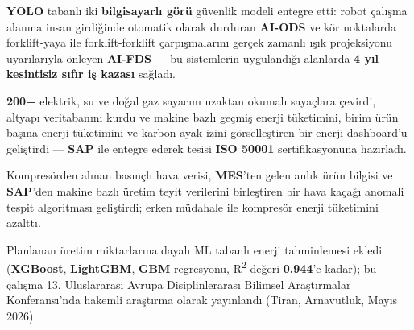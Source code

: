 \begin{cventries}
{\begin{cvitems}
        \item {\textbf{YOLO} tabanlı iki \textbf{bilgisayarlı görü} güvenlik modeli entegre etti: robot çalışma alanına insan girdiğinde otomatik olarak durduran \textbf{AI-ODS} ve kör noktalarda forklift-yaya ile forklift-forklift çarpışmalarını gerçek zamanlı ışık projeksiyonu uyarılarıyla önleyen \textbf{AI-FDS} --- bu sistemlerin uygulandığı alanlarda \textbf{4 yıl kesintisiz sıfır iş kazası} sağladı.}
        \item {\textbf{200+} elektrik, su ve doğal gaz sayacını uzaktan okumalı sayaçlara çevirdi, altyapı veritabanını kurdu ve makine bazlı geçmiş enerji tüketimini, birim ürün başına enerji tüketimini ve karbon ayak izini görselleştiren bir enerji dashboard'u geliştirdi --- \textbf{SAP} ile entegre ederek tesisi \textbf{ISO 50001} sertifikasyonuna hazırladı.}
        \item {Kompresörden alınan basınçlı hava verisi, \textbf{MES}'ten gelen anlık ürün bilgisi ve \textbf{SAP}'den makine bazlı üretim teyit verilerini birleştiren bir hava kaçağı anomali tespit algoritması geliştirdi; erken müdahale ile kompresör enerji tüketimini azalttı.}
        \item {Planlanan üretim miktarlarına dayalı ML tabanlı enerji tahminlemesi ekledi (\textbf{XGBoost}, \textbf{LightGBM}, \textbf{GBM} regresyonu, R\textsuperscript{2} değeri \textbf{0.944}'e kadar); bu çalışma 13. Uluslararası Avrupa Disiplinlerarası Bilimsel Araştırmalar Konferansı'nda hakemli araştırma olarak yayınlandı (Tiran, Arnavutluk, Mayıs 2026).}
      \end{cvitems}
    }


\end{cventries}
